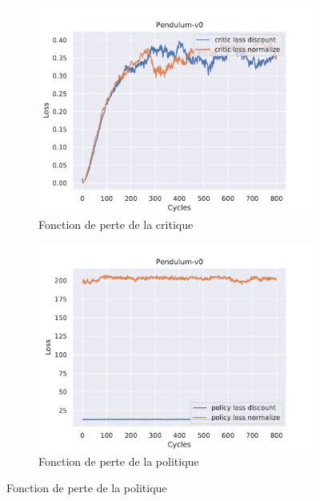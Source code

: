 \begin{figure}[H]
    \centering
    \begin{subfigure}{0.3\textwidth}
        \includegraphics[width=\textwidth]{figures/iteration4/critic_loss_Pendulum-v0_pg_dataset_td_eval_True_cycles_800_trajs_200_batches_20_gamma_0.99_nstep_5_lr_act_0.01_lr_critic_0.01pg.pdf}
        \caption{Fonction de perte de la critique}
    \end{subfigure}
    \begin{subfigure}{0.3\textwidth}
        \includegraphics[width=\textwidth]{figures/iteration4/policy_loss_Pendulum-v0_pg_dataset_td_eval_True_cycles_800_trajs_200_batches_20_gamma_0.99_nstep_5_lr_act_0.01_lr_critic_0.01pg.pdf}
        \caption{Fonction de perte de la politique}

\end{subfigure}
\end{figure}
